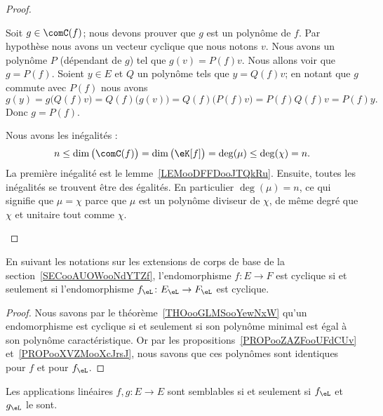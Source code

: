 \begin{proof}
\begin{subproof}
		Soit \( g\in \comC(f)\); nous devons prouver que \( g\) est un polynôme de \( f\). Par hypothèse nous avons un vecteur cyclique que nous notons \( v\). Nous avons un polynôme \( P\) (dépendant de \( g\)) tel que \( g(v)=P(f)v\). Nous allons voir que \( g=P(f)\). Soient \( y\in E\) et \( Q\) un polynôme tels que \( y=Q(f)v\); en notant que \( g\) commute avec \( P(f)\) nous avons
		\begin{equation}
			g(y)=g\big( Q(f)v \big)=Q(f)\big( g(v) \big)=Q(f)\big( P(f)v \big)=P(f)Q(f)v=P(f)y.
		\end{equation}
		Donc \( g=P(f)\).


		Nous avons les inégalités :
		\begin{equation}
			n\leq \dim\big( \comC(f) \big)=\dim\big( \eK[f] \big)=\deg(\mu)\leq \deg(\chi)=n.
		\end{equation}
		La première inégalité est le lemme~\ref{LEMooDFFDooJTQkRu}. Ensuite, toutes les inégalités se trouvent être des égalités. En particulier \( \deg(\mu)=n\), ce qui signifie que \( \mu=\chi\) parce que \( \mu\) est un polynôme diviseur de \( \chi\), de même degré que \( \chi\) et unitaire tout comme \( \chi\).

	\end{subproof}
\end{proof}

\begin{corollary}        \label{CORooAKQEooSliXPp}
	En suivant les notations sur les extensions de corps de base de la section~\ref{SECooAUOWooNdYTZf}, l'endomorphisme \( f\colon E\to F\) est cyclique si et seulement si l'endomorphisme \( f_{\eL}\colon E_{\eL}\to F_{\eL}\) est cyclique.
\end{corollary}

\begin{proof}
	Nous savons par le théorème~\ref{THOooGLMSooYewNxW} qu'un endomorphisme est cyclique si et seulement si son polynôme minimal est égal à son polynôme caractéristique. Or par les propositions~\ref{PROPooZAZFooUFdCUv} et~\ref{PROPooXVZMooXcJrsJ}, nous savons que ces polynômes sont identiques pour \( f\) et pour \( f_{\eL}\).
\end{proof}

\begin{theorem}      \label{THOooHUFBooReKZWG}
	Les applications linéaires \( f,g\colon E\to E\) sont semblables si et seulement si \( f_{\eL}\) et \( g_{\eL}\) le sont.
\end{theorem}

